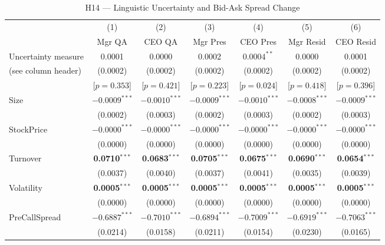 \documentclass[12pt,a4paper]{article}
\begin{document}
\begin{table}[H]
\centering
\caption{H14 --- Linguistic Uncertainty and Bid-Ask Spread Change}
\label{tab:h14}
\begin{threeparttable}
\begin{footnotesize}
\renewcommand{\arraystretch}{0.9}
\begin{tabular}{lcccccc}
\toprule
& (1) & (2) & (3) & (4) & (5) & (6) \\
& Mgr QA & CEO QA & Mgr Pres & CEO Pres & Mgr Resid & CEO Resid \\
\midrule
Uncertainty measure & 0.0001 & 0.0000 & 0.0002 & $\mathbf{0.0004}^{**}$ & 0.0000 & 0.0001 \\
(see column header) & (0.0002) & (0.0002) & (0.0002) & (0.0002) & (0.0002) & (0.0002) \\
 & [$p=0.353$] & [$p=0.421$] & [$p=0.223$] & [$p=0.024$] & [$p=0.418$] & [$p=0.396$] \\[1pt]
Size & $\mathbf{-0.0009}^{***}$ & $\mathbf{-0.0010}^{***}$ & $\mathbf{-0.0009}^{***}$ & $\mathbf{-0.0010}^{***}$ & $\mathbf{-0.0008}^{***}$ & $\mathbf{-0.0009}^{***}$ \\
 & (0.0002) & (0.0003) & (0.0002) & (0.0003) & (0.0002) & (0.0003) \\[1pt]
StockPrice & $\mathbf{-0.0000}^{***}$ & $\mathbf{-0.0000}^{***}$ & $\mathbf{-0.0000}^{***}$ & $\mathbf{-0.0000}^{***}$ & $\mathbf{-0.0000}^{***}$ & $\mathbf{-0.0000}^{***}$ \\
 & (0.0000) & (0.0000) & (0.0000) & (0.0000) & (0.0000) & (0.0000) \\[1pt]
Turnover & \textbf{0.0710}$^{***}$ & \textbf{0.0683}$^{***}$ & \textbf{0.0705}$^{***}$ & \textbf{0.0675}$^{***}$ & \textbf{0.0690}$^{***}$ & \textbf{0.0654}$^{***}$ \\
 & (0.0037) & (0.0040) & (0.0037) & (0.0041) & (0.0035) & (0.0039) \\[1pt]
Volatility & \textbf{0.0005}$^{***}$ & \textbf{0.0005}$^{***}$ & \textbf{0.0005}$^{***}$ & \textbf{0.0005}$^{***}$ & \textbf{0.0005}$^{***}$ & \textbf{0.0005}$^{***}$ \\
 & (0.0000) & (0.0000) & (0.0000) & (0.0000) & (0.0000) & (0.0000) \\[1pt]
PreCallSpread & $\mathbf{-0.6887}^{***}$ & $\mathbf{-0.7010}^{***}$ & $\mathbf{-0.6894}^{***}$ & $\mathbf{-0.7009}^{***}$ & $\mathbf{-0.6919}^{***}$ & $\mathbf{-0.7063}^{***}$ \\
 & (0.0214) & (0.0158) & (0.0211) & (0.0154) & (0.0230) & (0.0165) \\[1pt]

\end{tabular}
\end{footnotesize}
\end{threeparttable}
\end{table}
\end{document}
